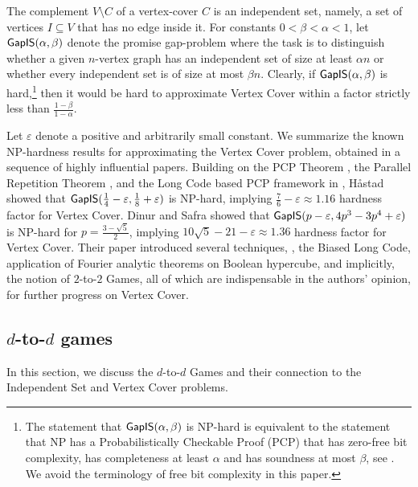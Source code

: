 \documentclass{toc}
\newcommand\eps{\varepsilon}
\begin{document}
The complement $V \setminus C$  of a vertex-cover $C$ is an independent set,
namely, a set of vertices $I \subseteq V$ that has no edge inside it. For constants $0 < \beta < \alpha <1$,
let ${\sf GapIS}(\alpha, \beta)$ denote
the promise gap-problem where the task is to distinguish whether a given $n$-vertex graph has an independent set
of size at least $\alpha n$ or whether every independent set is of size at most $\beta n$. Clearly, if
${\sf GapIS}(\alpha, \beta)$ is hard,\footnote{The statement that ${\sf GapIS}(\alpha, \beta)$ is NP-hard is
equivalent to the statement that NP has a Probabilistically Checkable Proof (PCP) that has zero-free bit complexity,
has completeness at least $\alpha$ and has soundness at most $\beta$, see \cite[Proposition 5.6, Theorem 8.2]{BGS}. We avoid
 the terminology of free bit complexity in this paper.}
 then it would be hard to approximate Vertex Cover  within a factor
strictly less than $\frac{1-\beta}{1-\alpha}$.

Let $\eps$ denote a positive and arbitrarily small constant. We summarize the known
 NP-hardness results for approximating the Vertex Cover problem, obtained in a sequence of
 highly influential papers.
 Building on the
PCP Theorem \cite{FGLSS96, AS98, ALMSS98}, the Parallel Repetition Theorem \cite{Raz98}, and the
Long Code based PCP framework in \cite{BGS}, H\aa stad \cite{Has99} showed that ${\sf GapIS}(\frac{1}{4}-\eps,\frac{1}{8}+\eps)$
is NP-hard, implying $\frac{7}{6}-\eps \approx 1.16$ hardness factor for Vertex Cover.
Dinur and Safra
\cite{DS05}  showed that ${\sf GapIS}(p-\eps, 4p^3-3p^4+\eps)$ is NP-hard for $p = \frac{3-\sqrt{5}}{2}$, implying
$10 \sqrt{5} - 21 - \eps \approx 1.36$ hardness factor for Vertex Cover. Their paper introduced several techniques, \eg, the
Biased Long Code, application of Fourier analytic theorems on Boolean hypercube, and implicitly, the notion of  $2$-to-$2$ Games,
all of which are indispensable in the authors' opinion, for further progress on Vertex Cover.


\subsection{\texorpdfstring{$d$-to-$d$}{s-to-d} games}


In this section, we discuss the $d$-to-$d$ Games and their connection to the Independent Set and
Vertex Cover problems.
\end{document}
